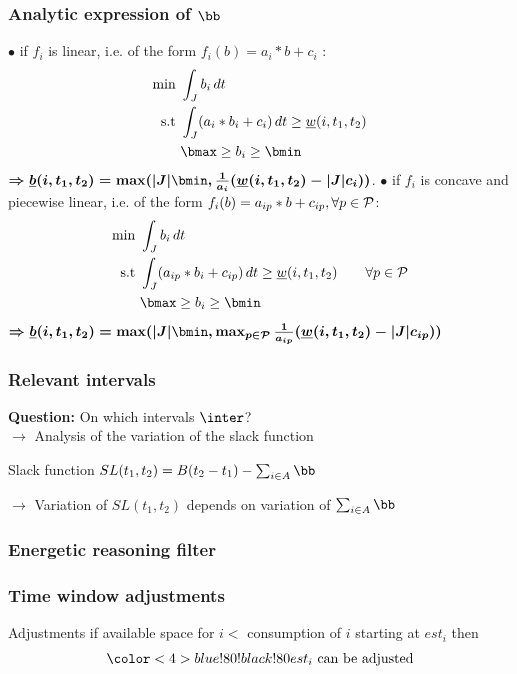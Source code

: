 \begin{frame}
  \frametitle{Analytic expression of $\bb$}
  \vfill
  $\bullet$ if $f_i$ is linear, i.e. of the form $f_i(b)= a_i*b+c_i$ :
  {\footnotesize
    \begin{align*}
      \text{min }  & \int_{J} b_i\,dt  \\
      \text{s.t } & \int_{J}(a_i*b_i+c_i)\,dt \ge
                    \underline{w}(i,t_1,t_2)\\
                   & \bmax \ge b_i \ge \bmin
    \end{align*}}
  { \color{blue!80!black!80}
    $\boldmath{\Rightarrow  \underline{b}(i,t_1,t_2)= \max ( |J|\bmin, \frac{1}{a_i}( \underline{w}(i,t_1,t_2)-|J|c_i))}$}.
  \vfill
  $\bullet$ if $f_i$ is concave and piecewise linear, i.e. of the form
  $f_i(b)=a_{ip}*b+c_{ip}, \forall p \in {\cal P}$:
  {\footnotesize 
    \begin{align*}
      \text{min }  & \int_{J} b_i\,dt  \\
      \text{s.t } & \int_{J}(a_{ip}*b_i+c_{ip})\,dt \ge
                    \underline{w}(i,t_1,t_2) \qquad \forall p \in
                    {\cal P}\\
                   & \bmax \ge b_i \ge \bmin
    \end{align*}}
  { \color{blue!80!black!80}
    $\boldmath{\Rightarrow  \underline{b}(i,t_1,t_2)= \max ( |J|\bmin, \max_{p
        \in {\cal P}} \frac{1}{a_{ip}}( \underline{w}(i,t_1,t_2)-|J|c_{ip}))}$}
  \vfill
\end{frame}


\begin{frame}
  \frametitle{Relevant intervals}
  {\bf Question: } On which intervals $\inter$?\\
  \vfill
  $\rightarrow$ Analysis of the variation of the slack function\\
  \vfill
  \begin{block}{Slack function}
    \centering $SL(t_1,t_2)=B(t_2-t_1) - \sum_{i \in A} \bb$
  \end{block}
  \vspace{0.8cm}
  $\rightarrow$ Variation of $SL(t_1,t_2)$ depends on variation of 
  $\sum_{i \in A} \bb$
  \vfill 
\end{frame}

\subsubsection{Energetic reasoning filter}

\begin{frame}
  \frametitle{Time window adjustments}
  \vspace{0.4cm}
  \begin{center}
    
  \end{center}
  \vfill
  \begin{block}{Adjustments}
    if { available space for $i$}$<${\color<2-3>{blue!80!black!80} consumption of $i$ starting at $est_i$}  then
    \[\color<4>{blue!80!black!80}est_i \text{ can be adjusted}\]
  \end{block}
  \vfill
\end{frame}

